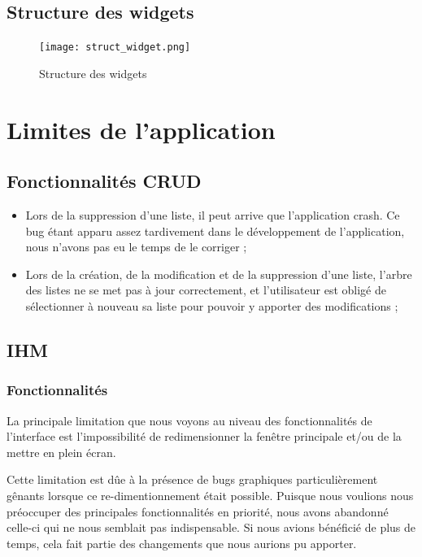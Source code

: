	\newpage
	\section{Structure des widgets}
	
		\begin{figure}[h!]
			\centering
		   \texttt{[image: struct\_widget.png]}
		   \caption{Structure des widgets}
		\end{figure}
		\FloatBarrier
		
		
		
	
\chapter{Limites de l'application}
	
	\section{Fonctionnalités CRUD}
	
		\begin{itemize}
			\item Lors de la suppression d'une liste, il peut arrive que l'application crash. Ce bug étant apparu assez tardivement dans le développement de l'application, nous n'avons pas eu le temps de le corriger ;
			\item Lors de la création, de la modification et de la suppression d'une liste, l'arbre des listes ne se met pas à jour correctement, et l'utilisateur est obligé de sélectionner à nouveau sa liste pour pouvoir y apporter des modifications ;
		\end{itemize}
		
		
	\section{IHM}
	
		\subsection{Fonctionnalités}
			La principale limitation que nous voyons au niveau des fonctionnalités de l'interface est l'impossibilité de redimensionner la fenêtre principale et/ou de la mettre en plein écran.
			
			Cette limitation est dûe à la présence de bugs graphiques particulièrement gênants lorsque ce re-dimentionnement était possible. Puisque nous voulions nous préoccuper des principales fonctionnalités en priorité, nous avons abandonné celle-ci qui ne nous semblait pas indispensable. Si nous avions bénéficié de plus de temps, cela fait partie des changements que nous aurions pu apporter.\\
			
